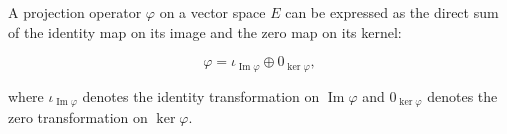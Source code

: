 A projection operator $\varphi$ on a vector space $E$ can be expressed as the direct sum of the identity map on its image and the zero map on its kernel:

$$
\varphi = \iota_{\operatorname{Im} \varphi} \oplus 0_{\ker \varphi},
$$

where $\iota_{\operatorname{Im} \varphi}$ denotes the identity transformation on $\operatorname{Im} \varphi$ and $0_{\ker \varphi}$ denotes the zero transformation on $\ker \varphi$.
